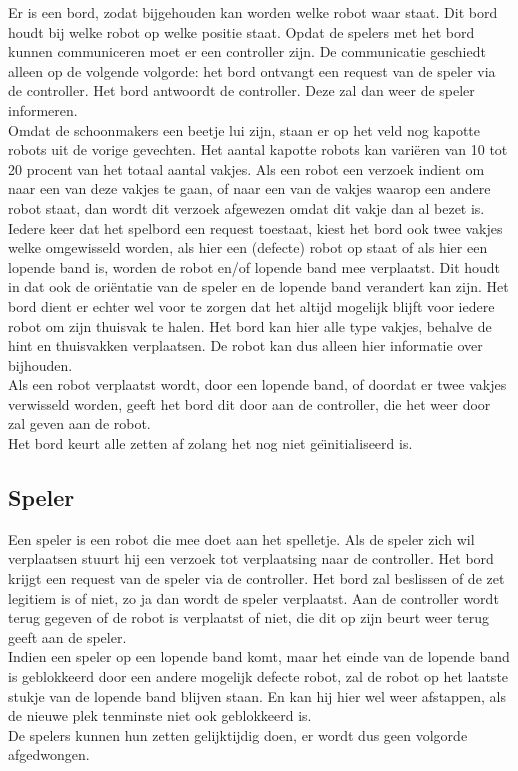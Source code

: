 Er is een bord, zodat bijgehouden kan worden welke robot waar staat. Dit bord houdt bij welke robot op welke positie staat. Opdat de spelers met het bord kunnen communiceren moet er een controller zijn. De communicatie geschiedt alleen op de volgende volgorde: het bord ontvangt een request van de speler via de controller. Het bord antwoordt de controller. Deze zal dan weer de speler informeren.\\
Omdat de schoonmakers een beetje lui zijn, staan er op het veld nog kapotte robots uit de vorige gevechten. Het aantal kapotte robots kan vari\"{e}ren van 10 tot 20 procent van het totaal aantal vakjes. Als een robot een verzoek indient om naar een van deze vakjes te gaan, of naar een van de vakjes waarop een andere robot staat, dan wordt dit verzoek afgewezen omdat dit vakje dan al bezet is.\\
Iedere keer dat het spelbord een request toestaat, kiest het bord ook twee vakjes welke omgewisseld worden, als hier een (defecte) robot op staat of als hier een lopende band is, worden de robot en/of lopende band mee verplaatst. Dit houdt in dat ook de ori\"{e}ntatie van de speler en de lopende band verandert kan zijn. Het bord dient er echter wel voor te zorgen dat het altijd mogelijk blijft voor iedere robot om zijn thuisvak te halen. Het bord kan hier alle type vakjes, behalve de hint en thuisvakken verplaatsen. De robot kan dus alleen hier informatie over bijhouden.\\
Als een robot verplaatst wordt, door een lopende band, of doordat er twee vakjes verwisseld worden, geeft het bord dit door aan de controller, die het weer door zal geven aan de robot.\\
Het bord keurt alle zetten af zolang het nog niet ge\"{\i}nitialiseerd is.

\subsection{Speler}

Een speler is een robot die mee doet aan het spelletje. Als de speler zich wil verplaatsen stuurt hij een verzoek tot verplaatsing naar de controller. Het bord krijgt een request van de speler via de controller. Het bord zal beslissen of de zet legitiem is of niet, zo ja dan wordt de speler verplaatst. Aan de controller wordt terug gegeven of de robot is verplaatst of niet, die dit op zijn beurt weer terug geeft aan de speler. \\
Indien een speler op een lopende band komt, maar het einde van de lopende band is geblokkeerd door een andere mogelijk defecte robot, zal de robot op het laatste stukje van de lopende band blijven staan. En kan hij hier wel weer afstappen, als de nieuwe plek tenminste niet ook geblokkeerd is.\\
De spelers kunnen hun zetten gelijktijdig doen, er wordt dus geen volgorde afgedwongen.

